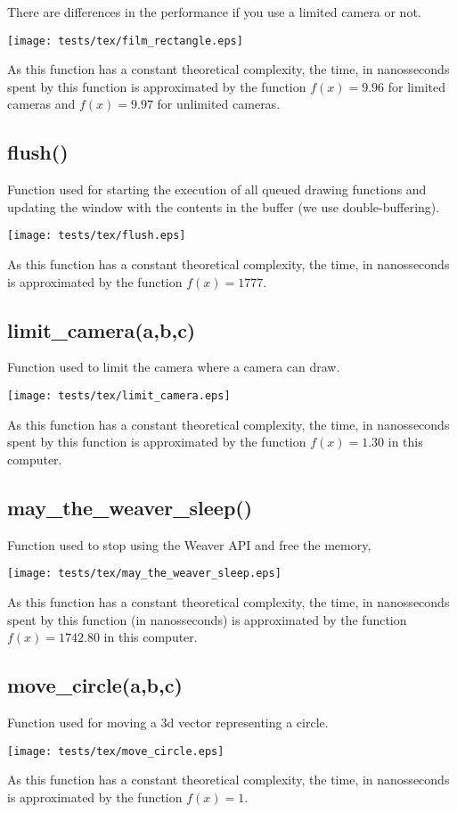\documentclass{article}
\begin{document}
There are differences in the performance if you use
a limited camera or not.

\texttt{[image: tests/tex/film\_rectangle.eps]}

As this function has a constant
theoretical complexity, the time, in nanosseconds
spent by this function is 
approximated by the function $f(x)=9.96$
for limited cameras and $f(x)=9.97$ for
unlimited cameras.
\subsection{flush()}
Function used for starting the execution of all
 queued drawing functions and updating the window
 with the contents in the buffer (we use double-buffering).

\texttt{[image: tests/tex/flush.eps]}

As this function has a constant theoretical
complexity, the time, in nanosseconds is 
approximated by the function $f(x)=1777$.
\subsection{limit\_camera(a,b,c)}
Function used to limit the camera where a camera 
can draw.

\texttt{[image: tests/tex/limit\_camera.eps]}

As this function has a constant
theoretical complexity, the time, in nanosseconds
spent by this function is 
approximated by the function $f(x)=1.30$
in this computer.
\subsection{may\_the\_weaver\_sleep()}
Function used to stop using  the Weaver API and
free the memory,

\texttt{[image: tests/tex/may\_the\_weaver\_sleep.eps]}

As this function has a constant theoretical
complexity, the time, in nanosseconds spent 
by this function (in nanosseconds) is
approximated by the function $f(x)=1742.80$
in this computer.
\subsection{move\_circle(a,b,c)}
Function used for moving a 3d vector representing a circle.


\texttt{[image: tests/tex/move\_circle.eps]}

As this function has a constant theoretical
complexity, the time, in nanosseconds is 
approximated by the function $f(x)=1$.
\end{document}
